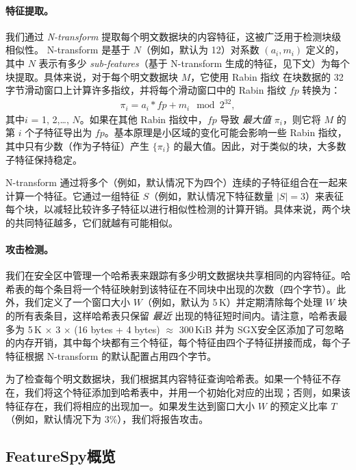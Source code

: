 \paragraph*{特征提取。}
我们通过 {\em N-transform} \cite{shilane12} 提取每个明文数据块的内容特征，这被广泛用于检测块级相似性。 N-transform 是基于 $N$（例如，默认为 12）对系数 $(a_i, m_i)$ 定义的，其中 $N$ 表示有多少 {\em sub-features}（基于 N-transform 生成的特征，见下文）为每个块提取。具体来说，对于每个明文数据块 $M$，它使用 Rabin 指纹 \cite{rabin81} 在块数据的 32 字节滑动窗口上计算许多指纹，并将每个滑动窗口中的 Rabin 指纹 $fp$ 转换为：
\begin{eqnarray}
  \label{eq:featurespy-feature}
  \pi_i = a_i * fp + m_i \mod 2^{32},
\end{eqnarray}
其中$i$ = 1, 2,\ldots, $N$。如果在其他 Rabin 指纹中，$fp$ 导致 {\em 最大值} $\pi_i$，则它将 $M$ 的第 $i$ 个子特征导出为 $fp$。基本原理是小区域的变化可能会影响一些 Rabin 指纹，其中只有少数（作为子特征）产生 $\{\pi_i\}$ 的最大值。因此，对于类似的块，大多数子特征保持稳定。

N-transform 通过将多个（例如，默认情况下为四个）连续的子特征组合在一起来计算一个特征。它通过一组特征 $S$（例如，默认情况下特征数量 $|S| = 3$）来表征每个块，以减轻比较许多子特征以进行相似性检测的计算开销。具体来说，两个块的共同特征越多，它们就越有可能相似。


\paragraph*{攻击检测。}
我们在安全区中管理一个哈希表来跟踪有多少明文数据块共享相同的内容特征。哈希表的每个条目将一个特征映射到该特征在不同块中出现的次数（四个字节）。此外，我们定义了一个窗口大小 $W$（例如，默认为 5\,K）并定期清除每个处理 $W$ 块的所有表条目，这样哈希表只保留 {\em 最近} 出现的特征短时间内。请注意，哈希表最多为 5\,K $\times$ 3 $\times$ (16 bytes + 4 bytes) $\approx$ 300\,KiB 并为 SGX安全区添加了可忽略的内存开销，其中每个块都有三个特征，每个特征由四个子特征拼接而成，每个子特征根据 N-transform 的默认配置占用四个字节。

为了检查每个明文数据块，我们根据其内容特征查询哈希表。如果一个特征不存在，我们将这个特征添加到哈希表中，并用一个初始化对应的出现；否则，如果该特征存在，我们将相应的出现加一。如果发生达到窗口大小 $W$ 的预定义比率 $T$（例如，默认情况下为 3\%），我们将报告攻击。



\subsection{FeatureSpy概览}
\label{subsec:featurespy-secure_design}

